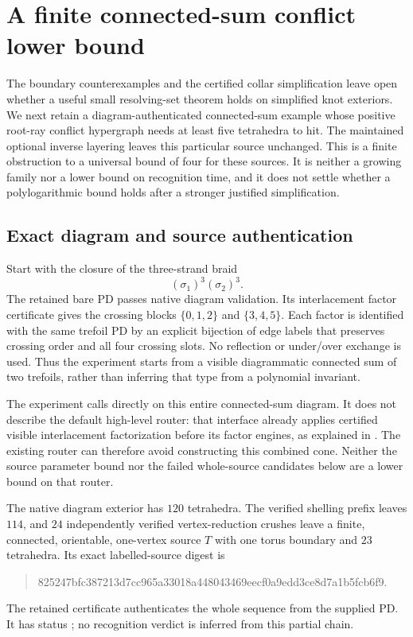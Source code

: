 \section{A finite connected-sum conflict lower bound}
\label{sec:conflict-composition}

The boundary counterexamples and the certified collar simplification leave
open whether a useful small resolving-set theorem holds on simplified knot
exteriors.  We next retain a diagram-authenticated connected-sum example
whose positive root-ray conflict hypergraph needs at least five tetrahedra
to hit.  The maintained optional inverse layering leaves this particular
source unchanged.  This is a finite obstruction to a universal bound of
four for these sources.  It is neither a growing family nor a lower bound
on recognition time, and it does not settle whether a polylogarithmic
bound holds after a stronger justified simplification.

\subsection{Exact diagram and source authentication}

Start with the closure of the three-strand braid
\[
 (\sigma_1)^3(\sigma_2)^3.
\]
The retained bare PD passes native diagram validation.  Its interlacement
factor certificate gives the crossing blocks $\{0,1,2\}$ and
$\{3,4,5\}$.  Each factor is identified with the same trefoil PD by an
explicit bijection of edge labels that preserves crossing order and all
four crossing slots.  No reflection or under/over exchange is used.
Thus the experiment starts from a visible diagrammatic connected sum of
two trefoils, rather than inferring that type from a polynomial invariant.

The experiment calls  directly on this entire
connected-sum diagram.  It does not describe the default high-level
 router: that interface already applies certified visible
interlacement factorization before its factor engines, as explained in
.  The existing router can therefore avoid
constructing this combined cone.  Neither the source parameter bound nor
the failed whole-source candidates below are a lower bound on that router.

The native diagram exterior has $120$ tetrahedra.  The verified shelling
prefix leaves $114$, and $24$ independently verified vertex-reduction
crushes leave a finite, connected, orientable, one-vertex source $T$ with
one torus boundary and $23$ tetrahedra.  Its exact labelled-source digest
is
\begin{quote}\small\ttfamily
825247bfc387213d7cc965a33018a448043469eecf0a9edd3ce8d7a1b5fcb6f9.
\end{quote}
The retained  certificate authenticates the
whole sequence from the supplied PD.  It has status ; no
recognition verdict is inferred from this partial chain.

